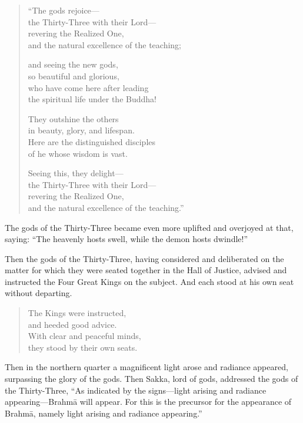 \documentclass[12pt,openany]{book}%
\begin{document}
\begin{verse}%
“The gods rejoice—\\
the Thirty-Three with their Lord—\\
revering the Realized One, \\
and the natural excellence of the teaching; 

and seeing the new gods, \\
so beautiful and glorious, \\
who have come here after leading \\
the spiritual life under the Buddha! 

They outshine the others \\
in beauty, glory, and lifespan. \\
Here are the distinguished disciples \\
of he whose wisdom is vast. 

Seeing this, they delight—\\
the Thirty-Three with their Lord—\\
revering the Realized One, \\
and the natural excellence of the teaching.” 

%
\end{verse}

The gods of the Thirty-Three became even more uplifted and overjoyed at that, saying: “The heavenly hosts swell, while the demon hosts dwindle!” 

Then the gods of the Thirty-Three, having considered and deliberated on the matter for which they were seated together in the Hall of Justice, advised and instructed the Four Great Kings on the subject. And each stood at his own seat without departing. 

\begin{verse}%
The Kings were instructed, \\
and heeded good advice. \\
With clear and peaceful minds, \\
they stood by their own seats. 

%
\end{verse}

Then in the northern quarter a magnificent light arose and radiance appeared, surpassing the glory of the gods. Then Sakka, lord of gods, addressed the gods of the Thirty-Three, “As indicated by the signs—light arising and radiance appearing—\textsanskrit{Brahmā} will appear. For this is the precursor for the appearance of \textsanskrit{Brahmā}, namely light arising and radiance appearing.” 
\end{document}
